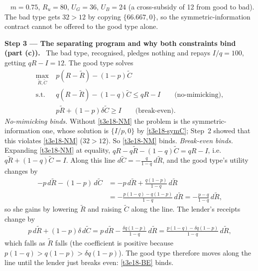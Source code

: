 \documentclass[11pt,a4paper]{article}
\newcommand{\step}[2]{\par\medskip\noindent\textbf{Step #1 --- #2.}~}
\newcommand{\answer}[1]{\par\smallskip\noindent\fbox{\textbf{Answer #1.}}~}
\begin{document}
\answer{(b)} $m=0.75$, $R_u=80$, $U_G=36$, $U_B=24$ (a cross-subsidy of 12 from good to bad). The bad type gets $32>12$ by copying $\{66.667,0\}$, so the symmetric-information contract cannot be offered to the good type alone.

\step{3}{The separating program and why both constraints bind (part (c))} The bad type, recognised, pledges nothing and repays $I/q=100$, getting $qR-I=12$. The good type solves
\begin{align}
  \max_{\tilde R,\tilde C}\ & p(R-\tilde R)-(1-p)\tilde C \nonumber\\
  \text{s.t. }\ & q(R-\tilde R)-(1-q)\tilde C \le qR-I \qquad\text{(no-mimicking)}, \label{t3e18-NM}\\
  & p\tilde R+(1-p)\delta\tilde C \ge I \qquad\text{(break-even)}. \label{t3e18-BE}
\end{align}
\emph{No-mimicking binds.} Without \eqref{t3e18-NM} the problem is the symmetric-information one, whose solution is $\{I/p,0\}$ by \eqref{t3e18-symC}; Step~2 showed that this violates \eqref{t3e18-NM} ($32>12$). So \eqref{t3e18-NM} binds. \emph{Break-even binds.} Expanding \eqref{t3e18-NM} at equality, $qR-q\tilde R-(1-q)\tilde C=qR-I$, i.e.\ $q\tilde R+(1-q)\tilde C=I$. Along this line $d\tilde C=-\frac{q}{1-q}\,d\tilde R$, and the good type's utility changes by
\begin{align}
  -p\,d\tilde R-(1-p)\,d\tilde C &= -p\,d\tilde R+\frac{q(1-p)}{1-q}\,d\tilde R \nonumber\\
  &= -\frac{p(1-q)-q(1-p)}{1-q}\,d\tilde R = -\frac{p-q}{1-q}\,d\tilde R, \nonumber
\end{align}
so she gains by lowering $\tilde R$ and raising $\tilde C$ along the line. The lender's receipts change by
\begin{align}
  p\,d\tilde R+(1-p)\delta\,d\tilde C = p\,d\tilde R-\frac{\delta q(1-p)}{1-q}\,d\tilde R = \frac{p(1-q)-\delta q(1-p)}{1-q}\,d\tilde R, \nonumber
\end{align}
which falls as $\tilde R$ falls (the coefficient is positive because $p(1-q)>q(1-p)>\delta q(1-p)$). The good type therefore moves along the line until the lender just breaks even: \eqref{t3e18-BE} binds.
\end{document}
